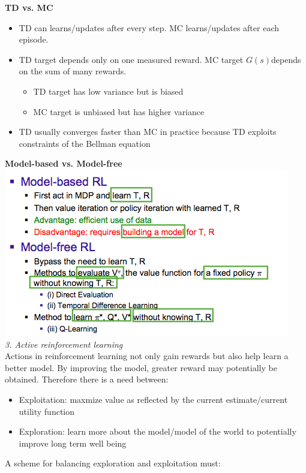 \documentclass[12pt]{article}
\begin{document}
\textbf{TD vs. MC}

\begin{itemize}
\item TD can learns/updates after every step. MC learns/updates after each episode. 
\item TD target depends only on one measured reward. MC target $G(s)$depends on the sum of many rewards.
\begin{itemize}
\item TD target has low variance but is biased
\item MC target is unbiased but has higher variance
\end{itemize}
\item TD usually converges faster than MC in practice because TD exploits constraints of the Bellman equation
\end{itemize}



\textbf{Model-based  vs. Model-free}\\

\includegraphics[scale=0.63]{models}\\



\noindent
\textsl{3. Active reinforcement learning}\\

\noindent
Actions in reinforcement learning not only gain rewards but also help learn a better model. By improving the model, greater reward may potentially be obtained. Therefore there is a need between:

\begin{itemize}
\item Exploitation: maxmize value as reflected by the current estimate/current utility function
\item Exploration: learn more about the model/model of the world to potentially improve long term well being
\end{itemize}
\noindent
A scheme for balancing exploration and exploitation must:
\end{document}
